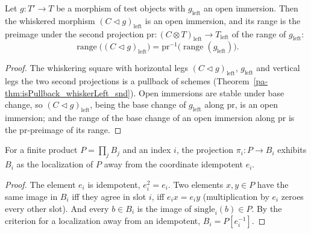 \begin{lemma}
  \label{pa-lem:range_whiskerLeft}
  \leanok

  Let \(g \colon T' \to T\) be a morphism of test objects with \(g_{\mathrm{left}}\) an open
  immersion. Then the whiskered morphism \((C \lhd g)_{\mathrm{left}}\) is an open immersion, and
  its range is the preimage under the second projection \(\mathrm{pr} \colon (C \otimes
  T)_{\mathrm{left}} \to T_{\mathrm{left}}\) of the range of \(g_{\mathrm{left}}\):
  \[
    \operatorname{range}\bigl((C \lhd g)_{\mathrm{left}}\bigr) = \mathrm{pr}^{-1}\bigl(
    \operatorname{range}(g_{\mathrm{left}})\bigr).
  \]
\end{lemma}
\begin{proof}
  \leanok
  The whiskering square with horizontal legs \((C \lhd g)_{\mathrm{left}}\), \(g_{\mathrm{left}}\)
  and vertical legs the two second projections is a pullback of schemes
  (Theorem~\ref{pa-thm:isPullback_whiskerLeft_snd}). Open immersions are stable under base change, so
  \((C \lhd g)_{\mathrm{left}}\), being the base change of \(g_{\mathrm{left}}\) along
  \(\mathrm{pr}\), is an open immersion; and the range of the base change of an open immersion along
  \(\mathrm{pr}\) is the \(\mathrm{pr}\)-preimage of its range.
\end{proof}

\begin{lemma}
  \label{pa-lem:isLocalization_away_piFactor}
  \leanok

  For a finite product \(P = \prod_j B_j\) and an index \(i\), the projection \(\pi_i \colon P \to
  B_i\) exhibits \(B_i\) as the localization of \(P\) away from the coordinate idempotent \(e_i\).
\end{lemma}
\begin{proof}
  \leanok
  The element \(e_i\) is idempotent, \(e_i^2 = e_i\). Two elements \(x, y \in P\) have the same
  image in \(B_i\) iff they agree in slot \(i\), iff \(e_i x = e_i y\) (multiplication by \(e_i\)
  zeroes every other slot). And every \(b \in B_i\) is the image of \(\mathrm{single}_i(b) \in P\).
  By the criterion for a localization away from an idempotent, \(B_i = P[e_i^{-1}]\).
\end{proof}


